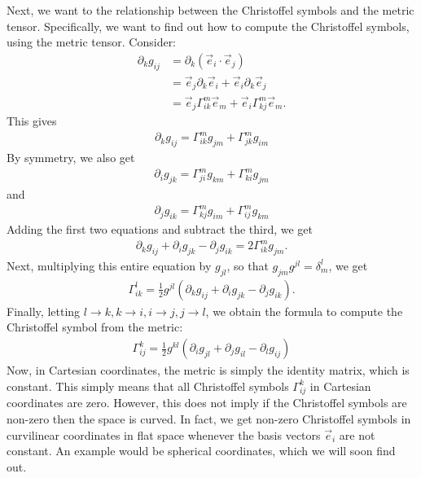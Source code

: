 \documentclass{book}
\theoremstyle{definition}
\begin{document}
Next, we want to the relationship between the Christoffel symbols and the metric tensor. Specifically, we want to find out how to compute the Christoffel symbols, using the metric tensor. Consider:
\begin{align*}
\partial_k g_{ij} &= \partial_k\left(\vec{e}_i\cdot\vec{e}_j \right) \\
&= \vec{e}_j\partial_k\vec{e}_i + \vec{e}_i\partial_k\vec{e}_j\\
&= \vec{e}_j \Gamma^{m}_{ik}\vec{e}_m + \vec{e}_i\Gamma^{m}_{kj}\vec{e}_m.
\end{align*}
This gives
\begin{align*}
\boxed{\partial_k g_{ij} = \Gamma^{m}_{ik}g_{jm} + \Gamma^{m}_{jk}g_{im}}
\end{align*}
By symmetry, we also get
\begin{align*}
\boxed{\partial_i g_{jk} = \Gamma^{m}_{ji}g_{km} + \Gamma^{m}_{ki}g_{jm}}
\end{align*}
and
\begin{align*}
\boxed{\partial_j g_{ik} = \Gamma^{m}_{kj}g_{im} + \Gamma^{m}_{ij}g_{km}}
\end{align*}
Adding the first two equations and subtract the third, we get
\begin{align*}
\partial_k g_{ij} + \partial_i g_{jk} - \partial_j g_{ik} = 2\Gamma^{m}_{ik}g_{jm}.
\end{align*}
Next, multiplying this entire equation by $g_{jl}$, so that $g_{jm}g^{jl} = \delta^l_m$, we get
\begin{align*}
\Gamma^{l}_{ik} = \frac{1}{2}g^{jl}\left( \partial_k g_{ij} + \partial_i g_{jk} - \partial_j g_{ik}\right).
\end{align*}
Finally, letting $l\rightarrow k, k\rightarrow i, i\rightarrow j, j\rightarrow l $, we obtain the formula to compute the Christoffel symbol from the metric:
\begin{align*}
\boxed{\Gamma^{k}_{ij} = \frac{1}{2}g^{kl}\left( \partial_i g_{jl} + \partial_j g_{il} - \partial_l g_{ij}\right)}
\end{align*}
Now, in Cartesian coordinates, the metric is simply the identity matrix, which is constant. This simply means that all Christoffel symbols $\Gamma^{k}_{ij}$ in Cartesian coordinates are zero. However, this does not imply if the Christoffel symbols are non-zero then the space is curved. In fact, we get non-zero Christoffel symbols in curvilinear coordinates in flat space whenever the basis vectors $\vec{e}_i$ are not constant. An example would be spherical coordinates, which we will soon find out.\\
\end{document}
